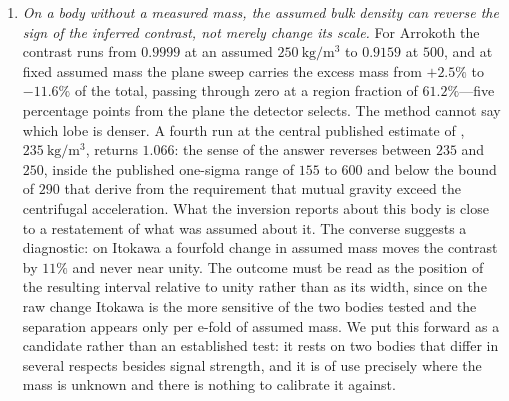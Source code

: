 \begin{enumerate}
\item \emph{On a body without a measured mass, the assumed bulk density
can reverse the sign of the inferred contrast, not merely change its
scale.} For Arrokoth the contrast runs from $0.9999$ at an assumed
$\SI{250}{\kilo\gram\per\cubic\metre}$ to $0.9159$ at $500$, and at fixed
assumed mass the plane sweep carries the excess mass from $+2.5\%$ to
$-11.6\%$ of the total, passing through zero at a region fraction of
$61.2\%$---five percentage points from the plane the detector selects. The
method cannot say which lobe is denser. A fourth run at the central published estimate of \citet{keane2022},
$\SI{235}{\kilo\gram\per\cubic\metre}$, returns $1.066$: the sense of the
answer reverses between $235$ and $250$, inside the published one-sigma
range of $155$ to $600$ and below the bound of $290$ that
\citet{spencer2020} derive from the requirement that mutual gravity
exceed the centrifugal acceleration. What the inversion reports about this
body is close to a restatement of what was assumed about it. The converse suggests a diagnostic: on Itokawa a fourfold change
in assumed mass moves the contrast by $11\%$ and never near unity. The
outcome must be read as the position of the resulting interval relative to
unity rather than as its width, since on the raw change Itokawa is the
more sensitive of the two bodies tested and the separation appears only
per e-fold of assumed mass. We put this forward as a candidate rather than
an established test: it rests on two bodies that differ in several
respects besides signal strength, and it is of use precisely where the
mass is unknown and there is nothing to calibrate it against.


\end{enumerate}
